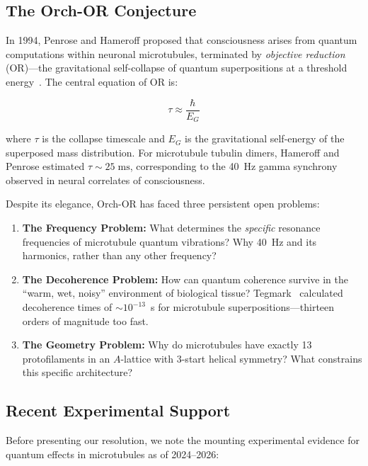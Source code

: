 \documentclass[12pt,a4paper]{article}
\theoremstyle{plain}
\theoremstyle{definition}
\newcommand{\EG}{E_G}
\begin{document}
\subsection{The Orch-OR Conjecture}

In 1994, Penrose and Hameroff proposed that consciousness arises from quantum computations within neuronal microtubules, terminated by \emph{objective reduction} (OR)---the gravitational self-collapse of quantum superpositions at a threshold energy~\cite{penrose1989,penrose1994,hameroff1996}. The central equation of OR is:

\begin{equation}
\label{eq:OR}
\tau \approx \frac{\hbar}{\EG}
\end{equation}

\noindent where $\tau$ is the collapse timescale and $\EG$ is the gravitational self-energy of the superposed mass distribution. For microtubule tubulin dimers, Hameroff and Penrose estimated $\tau \sim 25\;\mathrm{ms}$, corresponding to the 40~Hz gamma synchrony observed in neural correlates of consciousness.

Despite its elegance, Orch-OR has faced three persistent open problems:

\begin{enumerate}[label=(\roman*)]
    \item \textbf{The Frequency Problem:} What determines the \emph{specific} resonance frequencies of microtubule quantum vibrations? Why 40~Hz and its harmonics, rather than any other frequency?
    \item \textbf{The Decoherence Problem:} How can quantum coherence survive in the ``warm, wet, noisy'' environment of biological tissue? Tegmark~\cite{tegmark2000} calculated decoherence times of $\sim 10^{-13}$~s for microtubule superpositions---thirteen orders of magnitude too fast.
    \item \textbf{The Geometry Problem:} Why do microtubules have exactly 13 protofilaments in an $A$-lattice with 3-start helical symmetry? What constrains this specific architecture?
\end{enumerate}

\subsection{Recent Experimental Support}

Before presenting our resolution, we note the mounting experimental evidence for quantum effects in microtubules as of 2024--2026:
\end{document}

